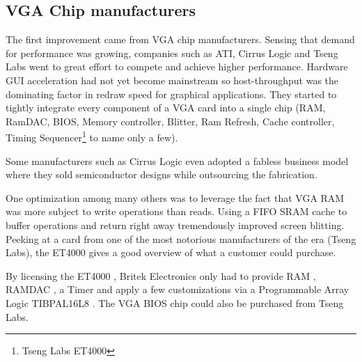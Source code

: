 \subsection{VGA Chip manufacturers}
The first improvement came from VGA chip manufacturers. Sensing that demand for performance was growing, companies such as ATI, Cirrus Logic and Tseng Labs went to great effort to compete and achieve higher performance. Hardware GUI acceleration had not yet become mainstream so host-throughput was the dominating factor in redraw speed for graphical applications. They started to tightly integrate every component of a VGA card into a single chip (RAM, RamDAC, BIOS, Memory controller, Blitter, Ram Refresh, Cache controller, Timing Sequencer\footnote{Tseng Labs ET4000} to name only a few).\\
\par
Some manufacturers such as Cirrus Logic even adopted a fabless business model where they sold semiconductor designs while outsourcing the fabrication.


One optimization among many others was to leverage the fact that VGA RAM was more subject to write operations than reads. Using a FIFO SRAM cache to buffer operations and return right away tremendously improved screen blitting. Peeking at a card from one of the most notorious manufacturers of the era (Tseng Labs), the ET4000 gives a good overview of what a customer could purchase.\\ 
\par
{}
\par
By licensing the ET4000 , Britek Electronics only had to provide RAM , RAMDAC , a Timer  and apply a few customizations via a Programmable Array Logic TIBPAL16L8 . The VGA BIOS chip  could also be purchased from Tseng Labs.\\
\par
\vspace{10pt}

\par



